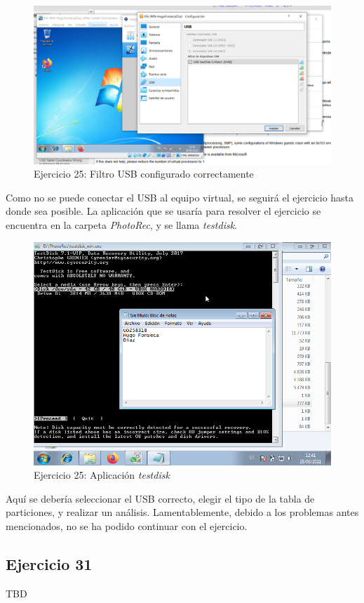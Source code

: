 \documentclass[11pt]{article}
\begin{document}
\begin{figure}[H]
    \caption{Ejercicio 25: Filtro USB configurado correctamente}
  \centering
    \includegraphics[scale=0.4]{p05/e25-5.PNG}
\end{figure}

Como no se puede conectar el USB al equipo virtual, se seguirá el ejercicio hasta donde sea posible. La aplicación que se usaría para resolver el ejercicio se encuentra en la carpeta \textit{PhotoRec}, y se llama \textit{testdisk}.

\begin{figure}[H]
    \caption{Ejercicio 25: Aplicación \textit{testdisk}}
  \centering
    \includegraphics[scale=0.8]{p05/e25-6.png}
\end{figure}

Aquí se debería seleccionar el USB correcto, elegir el tipo de la tabla de particiones, y realizar un análisis. Lamentablemente, debido a los problemas antes mencionados, no se ha podido continuar con el ejercicio.

\subsection{Ejercicio 31}
TBD
\end{document}
